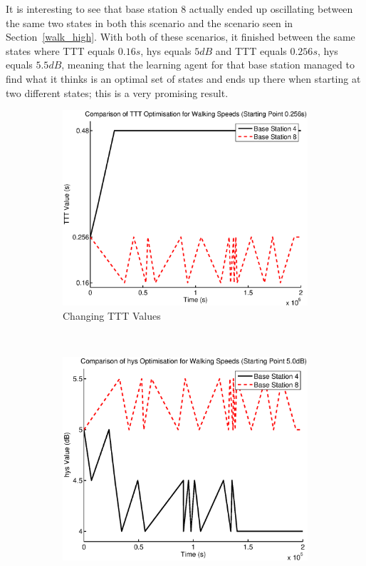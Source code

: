 It is interesting to see that base station 8 actually ended up oscillating between the same two states in both this scenario and the scenario seen in Section~\ref{walk_high}. With both of these scenarios, it finished between the same states where TTT equals $0.16 s$, hys equals $5 dB$ and TTT equals $0.256 s$, hys equals $5.5 dB$, meaning that the learning agent for that base station managed to find what it thinks is an optimal set of states and ends up there when starting at two different states; this is a very promising result. 
\begin{figure}[H]
        \centering
        \begin{subfigure}[b]{0.49\textwidth}
                \includegraphics[width=\textwidth]{figures/walking_figures/mid/long_ttt.eps}
                \caption{Changing TTT Values}
                \label{fig:walk_mid_ttt}
        \end{subfigure}%
        ~ %
        \begin{subfigure}[b]{0.49\textwidth}
                \includegraphics[width=\textwidth]{figures/walking_figures/mid/long_hys.eps}

\end{subfigure}
\end{figure}
